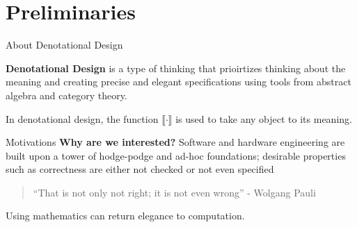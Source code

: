 \documentclass[aspectratio=169]{beamer}
\begin{document}
\begin{center}
\maketitle
{}
\end{center}
\section{Preliminaries}
\begin{frame}{About Denotational Design}

  \begin{defn}
    \textbf{Denotational Design} is a type of thinking that prioirtizes thinking about the meaning and creating precise and elegant specifications using tools from abstract algebra and category theory.
\end{defn}
\pause
\begin{notn}
  In denotational design, the function $\llbracket \cdot \rrbracket$ is used to take any object to its meaning.
\end{notn}
\end{frame}

\begin{frame}{Motivations}
  \textbf{Why are we interested?} \pause
  Software and hardware engineering are built upon a tower of hodge-podge and ad-hoc foundations; desirable properties
  such as correctness are either not checked or not even specified
  \pause
  \begin{quote}
    ``That is not only not right; it is not even wrong''
    - Wolgang Pauli
\end{quote}
\pause
Using mathematics can return elegance to computation.
\end{frame}
\end{document}

